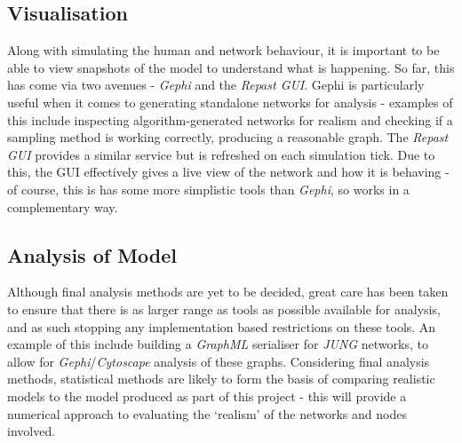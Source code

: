 \documentclass[]{article}
\begin{document}
\subsection{Visualisation}

Along with simulating the human and network behaviour, it is important to be able to view snapshots of the model to understand what is happening. So far, this has come via two avenues - \emph{Gephi} and the \emph{Repast GUI}. Gephi is particularly useful when it comes to generating standalone networks for analysis - examples of this include inspecting algorithm-generated networks for realism and checking if a sampling method is working correctly, producing a reasonable graph. The \emph{Repast GUI} provides a similar service but is refreshed on each simulation tick. Due to this, the GUI effectively gives a live view of the network and how it is behaving - of course, this is has some more simplistic tools than \emph{Gephi}, so works in a complementary way.

\subsection{Analysis of Model}

Although final analysis methods are yet to be decided, great care has been taken to ensure that there is as larger range as tools as possible available for analysis, and as such stopping any implementation based restrictions on these tools. An example of this include building a \emph{GraphML} serialiser for \emph{JUNG} networks, to allow for \emph{Gephi}/\emph{Cytoscape} analysis of these graphs. Considering final analysis methods, statistical methods are likely to form the basis of comparing realistic models to the model produced as part of this project - this will provide a numerical approach to evaluating the `realism' of the networks and nodes involved.
\end{document}
